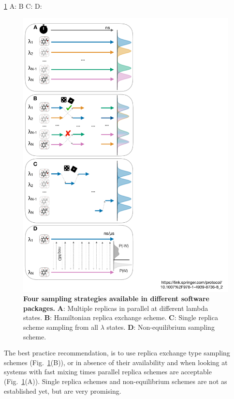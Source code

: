\documentclass[9pt,bestpractices]{livecoms}
\begin{document}
\ref{fig:fig_sampling_scheme} A:\cite{hedges2019biosimspace, song2019using } B\cite{aldeghi2015accurate, wang2015accurate,jiang2019computing} C:\cite{li2007simulated, tan2017optimally} D:\cite{aldeghi2018accurate}
\begin{figure}
    \includegraphics[width=0.95\columnwidth]{figures/fig8_sampl_scheme/Figure.pdf}
    \caption{\textbf{Four sampling strategies available in different software packages.} \textbf{A}: Multiple replicas in parallel at different lambda states. \textbf{B}: Hamiltonian replica exchange scheme. \textbf{C}: Single replica scheme sampling from all $\lambda$ states. \textbf{D}: Non-equilibrium sampling scheme.}
    \label{fig:fig_sampling_scheme}
\end{figure} 
The best practice recommendation, is to use replica exchange type sampling schemes (Fig.~\ref{fig:fig_sampling_scheme}(B)), or in absence of their availability and when looking at systems with fast mixing times parallel replica schemes are acceptable (Fig.~\ref{fig:fig_sampling_scheme}(A)). Single replica schemes and non-equilibrium schemes are not as established yet, but are very promising.
\end{document}
